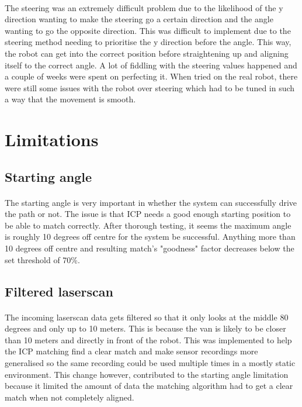 \paragraph{}
The steering was an extremely difficult problem due to the likelihood of the y direction wanting to make the steering go a certain direction and the angle wanting to go the opposite direction. This was difficult to implement due to the steering method needing to prioritise the y direction before the angle. This way, the robot can get into the correct position before straightening up and aligning itself to the correct angle. A lot of fiddling with the steering values happened and a couple of weeks were spent on perfecting it. When tried on the real robot, there were still some issues with the robot over steering which had to be tuned in such a way that the movement is smooth.

\section{Limitations}
\subsection{Starting angle}
\paragraph{}
The starting angle is very important in whether the system can successfully drive the path or not. The issue is that ICP needs a good enough starting position to be able to match correctly. After thorough testing, it seems the maximum angle is roughly 10 degrees off centre for the system be successful. Anything more than 10 degrees off centre and resulting match's "goodness" factor decreases below the set threshold of 70\%.

\subsection{Filtered laserscan}
\paragraph{}
The incoming laserscan data gets filtered so that it only looks at the middle 80 degrees and only up to 10 meters. This is because the van is likely to be closer than 10 meters and directly in front of the robot. This was implemented to help the ICP matching find a clear match and make sensor recordings more generalised so the same recording could be used multiple times in a mostly static environment. This change however, contributed to the starting angle limitation because it limited the amount of data the matching algorithm had to get a clear match when not completely aligned.

